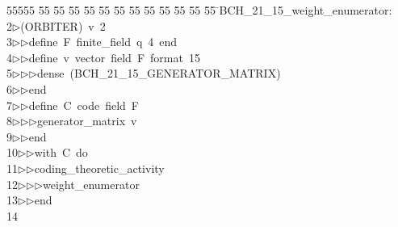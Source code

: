 %
%
\begin{tabbing}
55555 \= 55 \= 55 \= 55 \= 55 \= 55 \= 55 \= 55 \= 55 \= 55 \= 55 \= 55 \= 55 \= \>BCH\_21\_15\_weight\_enumerator:\\[0pt]
2\>$\triangleright$\>(ORBITER)\ v\ 2\ \\[0pt]
3\>$\triangleright$\>$\triangleright$\>define\ F\ finite\_field\ q\ 4\ end\ \\[0pt]
4\>$\triangleright$\>$\triangleright$\>define\ v\ vector\ field\ F\ format\ 15\ \\[0pt]
5\>$\triangleright$\>$\triangleright$\>$\triangleright$\>dense\ (BCH\_21\_15\_GENERATOR\_MATRIX)\ \\[0pt]
6\>$\triangleright$\>$\triangleright$\>end\ \\[0pt]
7\>$\triangleright$\>$\triangleright$\>define\ C\ code\ field\ F\ \\[0pt]
8\>$\triangleright$\>$\triangleright$\>$\triangleright$\>generator\_matrix\ v\ \\[0pt]
9\>$\triangleright$\>$\triangleright$\>end\ \\[0pt]
10\>$\triangleright$\>$\triangleright$\>with\ C\ do\ \\[0pt]
11\>$\triangleright$\>$\triangleright$\>coding\_theoretic\_activity\ \\[0pt]
12\>$\triangleright$\>$\triangleright$\>$\triangleright$\>weight\_enumerator\ \\[0pt]
13\>$\triangleright$\>$\triangleright$\>end\\[0pt]
14\>\end{tabbing}
